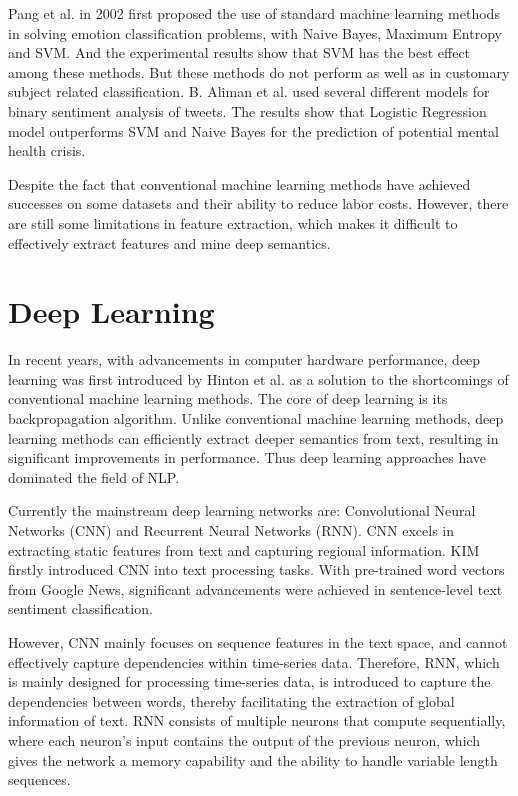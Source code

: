 \documentclass[ %
                    author={Bocheng Wang},
                supervisor={Dr. Qiang Liu},
                    degree={MSc},
                     title={A Research on Identification of Suicide Ideation in Texts with Multiple Models},
                      type={},
                      year={2024}]{dissertation}
\begin{document}
Pang et al. in 2002 first proposed the use of standard machine learning methods in solving emotion classification problems, with Naive Bayes, Maximum Entropy and SVM. And the experimental results show that SVM has the best effect among these methods. But these methods do not perform as well as in customary subject related classification.\cite{pang2002thumbs} B. Aliman et al. used several different models for binary sentiment analysis of tweets. The results show that Logistic Regression model outperforms SVM and Naive Bayes for the prediction of potential mental health crisis. \cite{aliman2022sentiment}

Despite the fact that conventional machine learning methods have achieved successes on some datasets and their ability to reduce labor costs. However, there are still some limitations in feature extraction, which makes it difficult to effectively extract features and mine deep semantics.

\section{Deep Learning}
\noindent
In recent years, with advancements in computer hardware performance, deep learning was first introduced by Hinton et al.\cite{hinton2006reducing} as a solution to the shortcomings of conventional machine learning methods. The core of deep learning is its backpropagation algorithm. Unlike conventional machine learning methods, deep learning methods can efficiently extract deeper semantics from text, resulting in significant improvements in performance. Thus deep learning approaches have dominated the field of NLP.

Currently the mainstream deep learning networks are: Convolutional Neural Networks (CNN)\cite{chua1998cnn} and Recurrent Neural Networks (RNN)\cite{socher2011parsing}. CNN excels in extracting static features from text and capturing regional information. KIM firstly introduced CNN into text processing tasks. With pre-trained word vectors from Google News, significant advancements were achieved in sentence-level text sentiment classification.\cite{2014Convolutional} 

However, CNN mainly focuses on sequence features in the text space, and cannot effectively capture dependencies within time-series data. Therefore, RNN, which is mainly designed for processing time-series data, is introduced to capture the dependencies between words, thereby facilitating the extraction of global information of text. RNN consists of multiple neurons that compute sequentially, where each neuron's input contains the output of the previous neuron, which gives the network a memory capability and the ability to handle variable length sequences.
\end{document}
